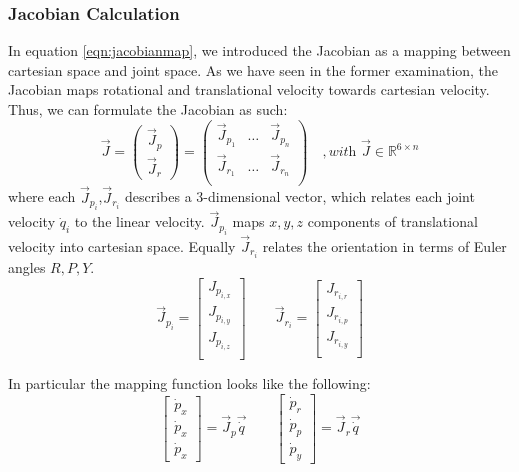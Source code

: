 \subsubsection*{Jacobian Calculation}
In equation \ref{eqn:jacobianmap}, we introduced the Jacobian as a mapping between cartesian space and joint space. As we have seen in the former examination, the Jacobian maps rotational and translational velocity towards cartesian velocity. Thus, we can formulate the Jacobian as such:
\begin{equation}
\vec{J} = \begin{pmatrix}
\vec{J}_p \\
\vec{J}_r
\end{pmatrix} = \begin{pmatrix}
\vec{J}_{p_{1}} & \dots & \vec{J}_{p_{n}} \\
\vec{J}_{r_{1}} & \dots & \vec{J}_{r_{n}} \\
\end{pmatrix} \quad ,\textit{with }\vec{J} \in \mathbb{R}^{6 \times n} \label{eqn:jacobiandecomposition}
\end{equation}
where each $\vec{J}_{p_{i}}$,$\vec{J}_{r_{i}}$ describes a 3-dimensional vector, which relates each joint velocity $\dot{q}_i$ to the linear velocity. $\vec{J}_{p_{i}}$ maps $x,y,z$ components of translational velocity into cartesian space. Equally $\vec{J}_{r_{i}}$ relates the orientation in terms of Euler angles $R,P,Y$. 
\begin{equation}
\vec{J}_{p_{i}} = \begin{bmatrix}
J_{p_{i,x}} \\ 
J_{p_{i,y}} \\
J_{p_{i,z}} \\
\end{bmatrix} \quad \quad
\vec{J}_{r_{i}} = \begin{bmatrix}
J_{r_{i,r}} \\ 
J_{r_{i,p}} \\
J_{r_{i,y}} \\
\end{bmatrix}
\end{equation}

In particular the mapping function looks like the following:
\begin{equation}
\begin{bmatrix}
\dot{p}_x \\
\dot{p}_x \\
\dot{p}_x
\end{bmatrix} =
\vec{J}_{p} 
\vec{\dot{q}}  \quad \quad
\begin{bmatrix}
\dot{p}_r \\
\dot{p}_p \\
\dot{p}_y
\end{bmatrix} =
\vec{J}_{r} 
\vec{\dot{q}}
\end{equation}

